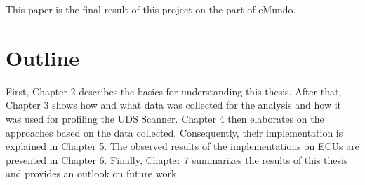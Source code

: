 This paper is the final result of this project on the part of eMundo.

\section{Outline}

First, Chapter 2 describes the basics for understanding this thesis. After that, Chapter 3 shows how and what data was collected for the analysis and how it was used for profiling the UDS Scanner. Chapter 4 then elaborates on the approaches based on the data collected. Consequently, their implementation is explained in Chapter 5. The observed results of the implementations on ECUs are presented in Chapter 6. Finally, Chapter 7 summarizes the results of this thesis and provides an outlook on future work.
